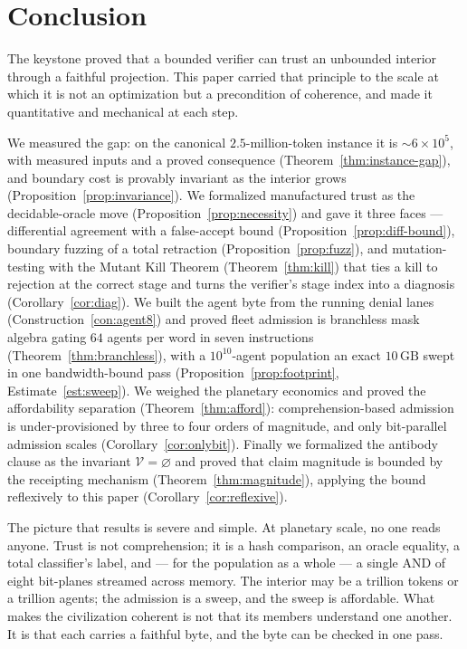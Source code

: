 \documentclass[11pt,oneside]{book}
\theoremstyle{definition}
\theoremstyle{plain}
\theoremstyle{remark}
\newcommand{\Over}{\mathcal{V}}                %
\begin{document}
\chapter{Conclusion}
\label{ch:concl}

The keystone proved that a bounded verifier can trust an unbounded interior through a faithful projection. %
This paper carried that principle to the scale at which it is not an optimization but a precondition of coherence, and made it quantitative and mechanical at each step. %

We measured the gap: on the canonical $2.5$-million-token instance it is $\sim\!6\times 10^{5}$, with measured inputs and a proved consequence (Theorem~\ref{thm:instance-gap}), and boundary cost is provably invariant as the interior grows (Proposition~\ref{prop:invariance}). %
We formalized manufactured trust as the decidable-oracle move (Proposition~\ref{prop:necessity}) and gave it three faces --- differential agreement with a false-accept bound (Proposition~\ref{prop:diff-bound}), boundary fuzzing of a total retraction (Proposition~\ref{prop:fuzz}), and mutation-testing with the Mutant Kill Theorem (Theorem~\ref{thm:kill}) that ties a kill to rejection at the correct stage and turns the verifier's stage index into a diagnosis (Corollary~\ref{cor:diag}). %
We built the agent byte from the running denial lanes (Construction~\ref{con:agent8}) and proved fleet admission is branchless mask algebra gating $64$ agents per word in seven instructions (Theorem~\ref{thm:branchless}), with a $10^{10}$-agent population an exact $10\,\mathrm{GB}$ swept in one bandwidth-bound pass (Proposition~\ref{prop:footprint}, Estimate~\ref{est:sweep}). %
We weighed the planetary economics and proved the affordability separation (Theorem~\ref{thm:afford}): comprehension-based admission is under-provisioned by three to four orders of magnitude, and only bit-parallel admission scales (Corollary~\ref{cor:onlybit}). %
Finally we formalized the antibody clause as the invariant $\Over=\varnothing$ and proved that claim magnitude is bounded by the receipting mechanism (Theorem~\ref{thm:magnitude}), applying the bound reflexively to this paper (Corollary~\ref{cor:reflexive}). %

The picture that results is severe and simple. %
At planetary scale, no one reads anyone. %
Trust is not comprehension; it is a hash comparison, an oracle equality, a total classifier's label, and --- for the population as a whole --- a single AND of eight bit-planes streamed across memory. %
The interior may be a trillion tokens or a trillion agents; the admission is a sweep, and the sweep is affordable. %
What makes the civilization coherent is not that its members understand one another. %
It is that each carries a faithful byte, and the byte can be checked in one pass. %
\end{document}
